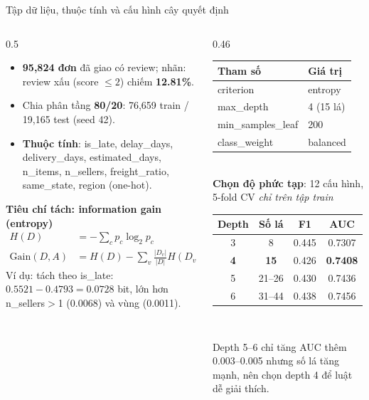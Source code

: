 \documentclass[aspectratio=169,10pt,xcolor=table]{beamer}
\begin{document}
\begin{frame}{Tập dữ liệu, thuộc tính và cấu hình cây quyết định}
  \begin{columns}[T]
    \begin{column}{0.5\textwidth}
      \footnotesize
      \begin{itemize}
        \item \textbf{95,824 đơn} đã giao có review; nhãn: review xấu (score $\le 2$) chiếm \textbf{12.81\%}.
        \item Chia phân tầng \textbf{80/20}: 76,659 train / 19,165 test (seed 42).
        \item \textbf{Thuộc tính}: is\_late, delay\_days, delivery\_days, estimated\_days, n\_items, n\_sellers, freight\_ratio, same\_state, region (one-hot).
      \end{itemize}
      \textbf{Tiêu chí tách: information gain (entropy)}
      \vspace{-0.5em}
      \begin{align*}
        H(D) &= -\textstyle\sum_c p_c\log_2 p_c\\
        \text{Gain}(D,A) &= H(D) - \textstyle\sum_v \frac{|D_v|}{|D|}H(D_v)
      \end{align*}
      Ví dụ: tách theo is\_late: $0.5521 - 0.4793 = \mathbf{0.0728}$ bit, lớn hơn n\_sellers$>$1 (0.0068) và vùng (0.0011).
    \end{column}
    \begin{column}{0.46\textwidth}
      \footnotesize
      \begin{tabular}{@{}ll@{}}
        \toprule
        Tham số & Giá trị\\
        \midrule
        criterion & entropy\\
        max\_depth & 4 (15 lá)\\
        min\_samples\_leaf & 200\\
        class\_weight & balanced\\
        \bottomrule
      \end{tabular}\\[0.2cm]
      \textbf{Chọn độ phức tạp}: 12 cấu hình, 5-fold CV \emph{chỉ trên tập train}\\[0.05cm]
      \begin{tabular}{@{}cccc@{}}
        \toprule
        Depth & Số lá & F1 & AUC\\
        \midrule
        3 & 8 & 0.445 & 0.7307\\
        \rowcolor{accent!12}\textbf{4} & \textbf{15} & 0.426 & \textbf{0.7408}\\
        5 & 21--26 & 0.430 & 0.7436\\
        6 & 31--44 & 0.438 & 0.7456\\
        \bottomrule
      \end{tabular}\\[0.1cm]
      {\scriptsize Depth 5--6 chỉ tăng AUC thêm 0.003--0.005 nhưng số lá tăng mạnh, nên chọn depth 4 để luật dễ giải thích.\par}
    \end{column}
  \end{columns}
\end{frame}
\end{document}
